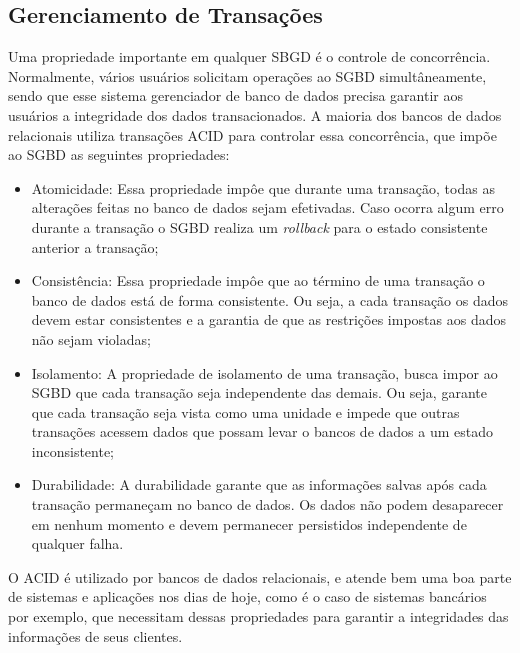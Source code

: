 \subsection{Gerenciamento de Transações} \label{manage_transaction}
	Uma propriedade importante em qualquer SBGD é o controle de concorrência. Normalmente, vários usuários solicitam operações ao SGBD simultâneamente, sendo que esse sistema gerenciador de banco de dados precisa garantir aos usuários a integridade dos dados transacionados. A maioria dos bancos de dados relacionais utiliza transações ACID \cite{SistemaDeBd} para controlar essa concorrência, que impõe ao SGBD as seguintes propriedades:
	\begin{itemize}
		\item Atomicidade: Essa propriedade impôe que durante uma transação, todas as alterações feitas no banco de dados sejam efetivadas. Caso ocorra algum erro durante a transação o SGBD realiza um \textit{rollback} para o estado consistente anterior a transação;
		\item Consistência: Essa propriedade impôe que ao término de uma transação o banco de dados está de forma consistente. Ou seja, a cada transação os dados devem estar consistentes e a garantia de que as restrições impostas aos dados não sejam violadas;
		\item Isolamento: A propriedade de isolamento de uma transação, busca impor ao SGBD que cada transação seja independente das demais. Ou seja, garante que cada transação seja vista como uma unidade e impede que outras transações acessem dados que possam levar o bancos de dados a um estado inconsistente;
		\item Durabilidade: A durabilidade garante que as informações salvas após cada transação permaneçam no banco de dados. Os dados não podem desaparecer em nenhum momento e devem permanecer persistidos independente de qualquer falha.
	\end{itemize}
	
	O ACID é utilizado por bancos de dados relacionais, e atende bem uma boa parte de sistemas e aplicações nos dias de hoje, como é o caso de sistemas bancários por exemplo, que necessitam dessas propriedades para garantir a integridades das informações de seus clientes.
	
